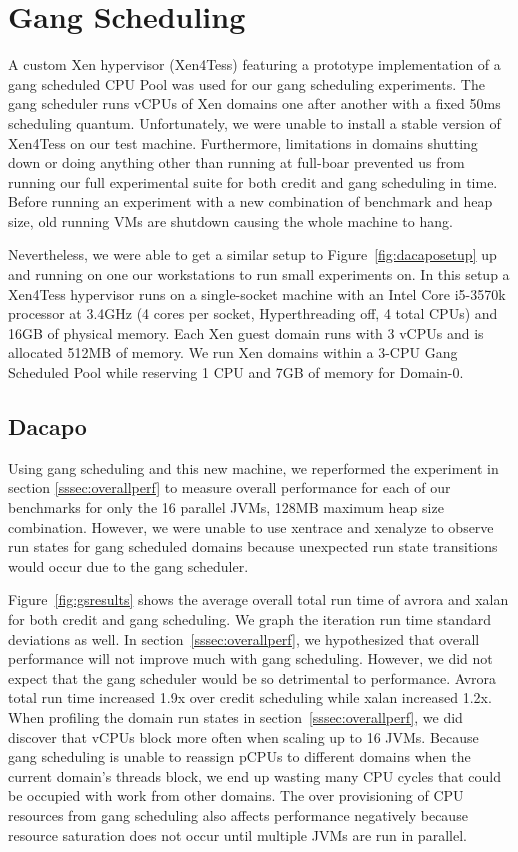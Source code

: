 \documentclass{sig-alternate}
\begin{document}
\section{Gang Scheduling} \label{sec:gs}
A custom Xen hypervisor (Xen4Tess) featuring a prototype implementation of a gang scheduled CPU Pool was used for our gang scheduling experiments. The gang scheduler runs vCPUs of Xen domains one after another with a fixed 50ms scheduling quantum. Unfortunately, we were unable to install a stable version of Xen4Tess on our test machine. Furthermore, limitations in domains shutting down or doing anything other than running at full-boar prevented us from running our full experimental suite for both credit and gang scheduling in time. Before running an experiment with a new combination of benchmark and heap size, old running VMs are shutdown causing the whole machine to hang.

Nevertheless, we were able to get a similar setup to Figure~\ref{fig:dacaposetup} up and running on one our workstations to run small experiments on. In this setup a Xen4Tess hypervisor runs on a single-socket machine with an Intel Core i5-3570k processor at 3.4GHz (4 cores per socket, Hyperthreading off,  4 total CPUs) and 16GB of physical memory. Each Xen guest domain runs with 3 vCPUs and is allocated 512MB of memory. We run Xen domains within a 3-CPU Gang Scheduled Pool while reserving 1 CPU and 7GB of memory for Domain-0.

\subsection{Dacapo}
Using gang scheduling and this new machine, we reperformed the experiment in section \ref{sssec:overallperf} to measure overall performance for each of our benchmarks for only the 16 parallel JVMs, 128MB maximum heap size combination. However, we were unable to use xentrace and xenalyze to observe run states for gang scheduled domains because unexpected run state transitions would occur due to the gang scheduler.

Figure~\ref{fig:gsresults} shows the average overall total run time of avrora and xalan for both credit and gang scheduling. We graph the iteration run time standard deviations as well. In section~\ref{sssec:overallperf}, we hypothesized that overall performance will not improve much with gang scheduling. However, we did not expect that the gang scheduler would be so detrimental to performance. Avrora total run time increased 1.9x over credit scheduling while xalan increased 1.2x. When profiling the domain run states in section~\ref{sssec:overallperf}, we did discover that vCPUs block more often when scaling up to 16 JVMs. Because gang scheduling is unable to reassign pCPUs to different domains when the current domain's threads block, we end up wasting many CPU cycles that could be occupied with work from other domains. The over provisioning of CPU resources from gang scheduling also affects performance negatively because resource saturation does not occur until multiple JVMs are run in parallel.
\end{document}
